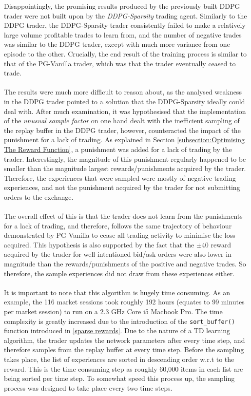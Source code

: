 \documentclass[ %
                    author={Ashwinder Khurana},
                supervisor={Prof Dave Cliff},
                    degree={MEng},
                     title={The Deeply Reinforced Trader},
                  subtitle={},
                      type={enterprise},
                      year={2020} ]{dissertation}
\begin{document}
{%
\noindent
Disappointingly, the promising results produced by the previously built DDPG trader were not built upon by the \textit{DDPG-Sparsity} trading agent. Similarly to the DDPG trader, the DDPG-Sparsity trader consistently failed to make a relatively large volume profitable trades to learn from, and the number of negative trades was similar to the DDPG trader, except with much more variance from one episode to the other. Crucially, the end result of the training process is similar to that of the PG-Vanilla trader, which was that the trader eventually ceased to trade.
\\
\\
\noindent
The results were much more difficult to reason about, as the analysed weakness in the DDPG trader pointed to a solution that the DDPG-Sparsity ideally could deal with. After much examination, it was hypothesised that the implementation of the \textit{unusual sample factor} on one hand dealt with the inefficient sampling of the replay buffer in the DDPG trader, however, counteracted the impact of the punishment for a lack of trading. As explained in Section \ref{subsection:Optimising The Reward Function}, a punishment was added for a lack of trading by the trader. Interestingly, the magnitude of this punishment regularly happened to be smaller than the magnitude largest rewards/punishments acquired by the trader. Therefore, the experiences that were sampled were mostly of negative trading experiences, and not the punishment acquired by the trader for not submitting orders to the exchange. 
\\
\\
\noindent
The overall effect of this is that the trader does not learn from the punishments for a lack of trading, and therefore, follows the same trajectory of behaviour demonstrated by PG-Vanilla to cease all trading activity to minimise the loss acquired. This hypothesis is also supported by the fact that the $\pm40$ reward acquired by the trader for well intentioned bid/ask orders were also lower in magnitude than the rewards/punishments of the positive and negative trades. So therefore, the sample experiences did not draw from these experiences either. 
\\
\\
\noindent
It is important to note that this algorithm is hugely time consuming. As an example, the 116 market sessions took roughly 192 hours (equates to 99 minutes per market session) to run on a 2.3 GHz Core i5 Macbook Pro. The time complexity is greatly increased due to the introduction of the \texttt{sort\_buffer()} function introduced in \ref{sparse rewards}. Due to the nature of a TD learning algorithm, the trader updates the network parameters after every time step, and therefore samples from the replay buffer at every time step. Before the sampling takes place, the list of experiences are sorted in descending order w.r.t to the reward. This is the time consuming step as roughly 60,000 items in each list are being sorted per time step. To somewhat speed this process up, the sampling process was designed to take place every two time steps.
}
\end{document}

